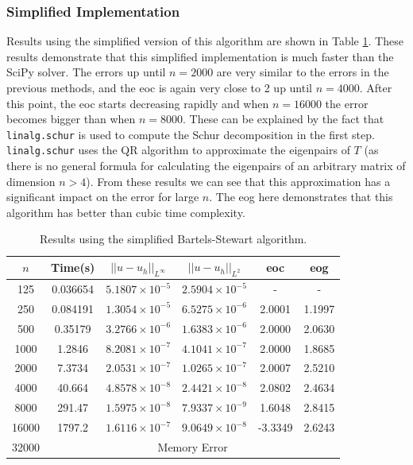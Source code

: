 \documentclass[11pt]{article}
\numberwithin{equation}{section}
\begin{document}
\subsubsection*{Simplified Implementation}

Results using the simplified version of this algorithm are shown in Table \ref{table:bartels simplified}. These results demonstrate that this simplified implementation is much faster than the SciPy solver. The errors up until $n=2000$ are very similar to the errors in the previous methods, and the eoc is again very close to 2 up until $n=4000$. After this point, the eoc starts decreasing rapidly and when $n=16000$ the error becomes bigger than when $n=8000$. These can be explained by the fact that \texttt{linalg.schur} is used to compute the Schur decomposition in the first step. \texttt{linalg.schur} uses the QR algorithm to approximate the eigenpairs of $T$ (as there is no general formula for calculating the eigenpairs of an arbitrary matrix of dimension $n>4$). From these results we can see that this approximation has a significant impact on the error for large $n$. The eog here demonstrates that this algorithm has better than cubic time complexity.
\begin{table}[H]
\centering
\begin{tabular}{|c|c|c|c|c|c|}
\hline
$n$ & Time(s) & $|| u - u_h ||_{L^{\infty}}$ &$|| u - u_h ||_{L^{2}}$ & eoc & eog \\
\hline
125 & 0.036654 & $5.1807 \times 10^{-5}$ & $2.5904 \times 10^{-5}$ & - & - \\
250 & 0.084191 & $1.3054 \times 10^{-5}$ & $6.5275 \times 10^{-6}$ & 2.0001 & 1.1997 \\
500 & 0.35179 & $3.2766 \times 10^{-6}$ & $1.6383 \times 10^{-6}$ & 2.0000 & 2.0630 \\
1000 & 1.2846 & $8.2081 \times 10^{-7}$ & $4.1041 \times 10^{-7}$ & 2.0000 & 1.8685 \\
2000 & 7.3734 & $2.0531 \times 10^{-7}$ & $1.0265 \times 10^{-7}$ & 2.0007 & 2.5210 \\
4000 & 40.664 & $4.8578 \times 10^{-8}$ & $2.4421 \times 10^{-8}$ & 2.0802 & 2.4634 \\
8000 & 291.47 & $1.5975 \times 10^{-8}$ & $7.9337 \times 10^{-9}$ & 1.6048 & 2.8415 \\
16000 & 1797.2 & $1.6116 \times 10^{-7}$ & $9.0649 \times 10^{-8}$ & -3.3349 & 2.6243 \\
\cline{2-6}
32000 & \multicolumn{5}{c|}{Memory Error} \\
\hline
\end{tabular}
\caption{Results using the simplified Bartels-Stewart algorithm.}
\label{table:bartels simplified}
\end{table}
\end{document}
